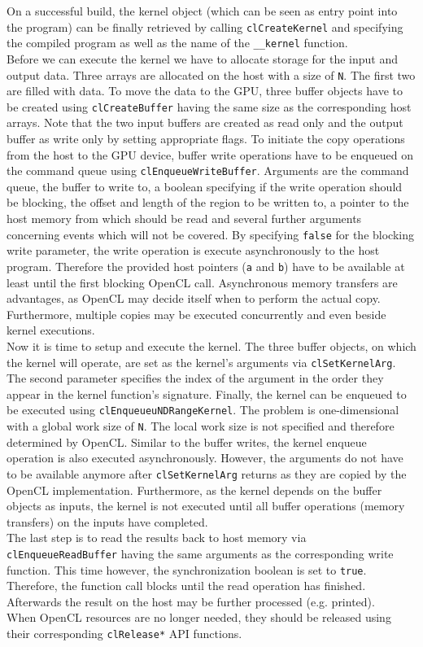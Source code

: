 On a successful build, the kernel object (which can be seen as entry point into the program) can be finally retrieved by calling \lstinline!clCreateKernel! and specifying the compiled program as well as the name of the \lstinline!__kernel! function. \\
Before we can execute the kernel we have to allocate storage for the input and output data. Three arrays are allocated on the host with a size of \lstinline!N!. The first two are filled with data. To move the data to the GPU, three buffer objects have to be created using \lstinline!clCreateBuffer! having the same size as the corresponding host arrays. Note that the two input buffers are created as read only and the output buffer as write only by setting appropriate flags. To initiate the copy operations from the host to the GPU device, buffer write operations have to be enqueued on the command queue using \lstinline!clEnqueueWriteBuffer!. Arguments are the command queue, the buffer to write to, a boolean specifying if the write operation should be blocking, the offset and length of the region to be written to, a pointer to the host memory from which should be read and several further arguments concerning events which will not be covered. By specifying \lstinline!false! for the blocking write parameter, the write operation is execute asynchronously to the host program. Therefore the provided host pointers (\lstinline!a! and \lstinline!b!) have to be available at least until the first blocking OpenCL call. Asynchronous memory transfers are advantages, as OpenCL may decide itself when to perform the actual copy. Furthermore, multiple copies may be executed concurrently and even beside kernel executions.\\
Now it is time to setup and execute the kernel. The three buffer objects, on which the kernel will operate, are set as the kernel's arguments via \lstinline!clSetKernelArg!. The second parameter specifies the index of the argument in the order they appear in the kernel function's signature. Finally, the kernel can be enqueued to be executed using \lstinline!clEnqueueuNDRangeKernel!. The problem is one-dimensional with a global work size of \lstinline!N!. The local work size is not specified and therefore determined by OpenCL. Similar to the buffer writes, the kernel enqueue operation is also executed asynchronously. However, the arguments do not have to be available anymore after \lstinline!clSetKernelArg! returns as they are copied by the OpenCL implementation. Furthermore, as the kernel depends on the buffer objects as inputs, the kernel is not executed until all buffer operations (memory transfers) on the inputs have completed. \\
The last step is to read the results back to host memory via \lstinline!clEnqueueReadBuffer! having the same arguments as the corresponding write function. This time however, the synchronization boolean is set to \lstinline!true!. Therefore, the function call blocks until the read operation has finished. Afterwards the result on the host may be further processed (e.g. printed). \\
When OpenCL resources are no longer needed, they should be released using their corresponding \lstinline!clRelease*! API functions.